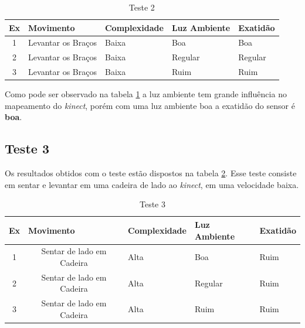 \begin{table}[H]
\centering
\caption{Teste 2}
\label{tab:teste2}
\begin{tabular}{@{}|c|c|l|l|l|@{}}
\toprule
\multicolumn{1}{|l|}{\textbf{Ex}} & \multicolumn{1}{l|}{\textbf{Movimento}} & \textbf{Complexidade} & \textbf{Luz Ambiente} & \textbf{Exatidão} \\ \midrule
1                                 & Levantar os  Braços                     & Baixa                 & Boa                   & Boa               \\ \midrule
2                                 & Levantar os  Braços                     & Baixa                 & Regular               & Regular           \\ \midrule
3                                 & Levantar os  Braços                     & Baixa                 & Ruim                  & Ruim              \\ \bottomrule
\end{tabular}
\end{table}

Como pode ser observado na tabela \ref{tab:teste2} a luz ambiente tem grande influência no mapeamento do \textit{kinect}, porém com uma luz ambiente boa
a exatidão do sensor é \textbf{boa}.

\subsection{Teste 3}\label{sub:teste3}
Os resultados obtidos com o teste estão dispostos na tabela \ref{tab:teste3}. Esse teste consiste em sentar e levantar em uma cadeira de lado ao \textit{kinect}, em uma velocidade
baixa.


\begin{table}[H]
\centering
\caption{Teste 3}
\label{tab:teste3}
\begin{tabular}{@{}|c|c|l|l|l|@{}}
\toprule
\multicolumn{1}{|l|}{\textbf{Ex}} & \multicolumn{1}{l|}{\textbf{Movimento}} & \textbf{Complexidade} & \textbf{Luz Ambiente} & \textbf{Exatidão} \\ \midrule
1                                 & Sentar de lado em Cadeira                     & Alta                 & Boa                   & Ruim               \\ \midrule
2                                 & Sentar de lado em Cadeira                     & Alta                 & Regular               & Ruim           \\ \midrule
3                                 & Sentar de lado em Cadeira                     & Alta                 & Ruim                  & Ruim              \\ \bottomrule
\end{tabular}
\end{table}

